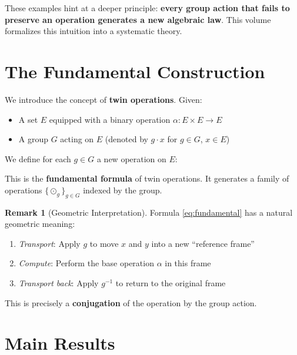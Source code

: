 \documentclass[11pt,a4paper,openany]{book}
\theoremstyle{plain}
\theoremstyle{definition}
\newtheorem{remark}[theorem]{Remark}
\newcommand{\twing}[1]{\odot_{#1}}
\newcommand{\actspace}{E}
\newcommand{\groupG}{G}
\newcommand{\emphbox}[1]{%
    \begin{center}
    \fbox{\parbox{0.85\textwidth}{\centering #1}}
    \end{center}
}
\begin{document}
These examples hint at a deeper principle: \textbf{every group action that fails to preserve an operation generates a new algebraic law}. This volume formalizes this intuition into a systematic theory.

\section{The Fundamental Construction}

We introduce the concept of \textbf{twin operations}. Given:
\begin{itemize}
    \item A set $\actspace$ equipped with a binary operation $\alpha: \actspace \times \actspace \to \actspace$
    \item A group $\groupG$ acting on $\actspace$ (denoted by $g \cdot x$ for $g \in \groupG$, $x \in \actspace$)
\end{itemize}

\noindent We define for each $g \in \groupG$ a new operation on $\actspace$:

\emphbox{
\begin{equation}\label{eq:fundamental}
\boxed{x \twing{g} y := g^{-1}\big(g \cdot x \,\alpha\, g \cdot y\big)}
\end{equation}
}

\noindent This is the \textbf{fundamental formula} of twin operations. It generates a family of operations $\{\twing{g}\}_{g \in \groupG}$ indexed by the group.

\begin{remark}[Geometric Interpretation]
Formula \eqref{eq:fundamental} has a natural geometric meaning:
\begin{enumerate}
    \item \emph{Transport}: Apply $g$ to move $x$ and $y$ into a new ``reference frame''
    \item \emph{Compute}: Perform the base operation $\alpha$ in this frame
    \item \emph{Transport back}: Apply $g^{-1}$ to return to the original frame
\end{enumerate}
This is precisely a \textbf{conjugation} of the operation by the group action.
\end{remark}

\section{Main Results}
\end{document}

